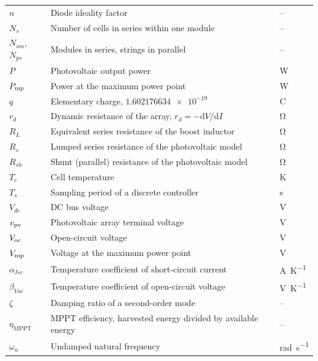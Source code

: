 \begin{longtable}{@{}L{0.16\textwidth}L{0.62\textwidth}L{0.14\textwidth}@{}}
$n$ & Diode ideality factor & -- \\
$N_s$ & Number of cells in series within one module & -- \\
$N_{sm}$, $N_{ps}$ & Modules in series, strings in parallel & -- \\
$P$ & Photovoltaic output power & \si{\watt} \\
$P_{\mathrm{mp}}$ & Power at the maximum power point & \si{\watt} \\
$q$ & Elementary charge, $\num{1.602176634e-19}$ & \si{\coulomb} \\
$r_d$ & Dynamic resistance of the array, $r_d = -\mathrm{d}V/\mathrm{d}I$ & \si{\ohm} \\
$R_L$ & Equivalent series resistance of the boost inductor & \si{\ohm} \\
$R_s$ & Lumped series resistance of the photovoltaic model & \si{\ohm} \\
$R_{sh}$ & Shunt (parallel) resistance of the photovoltaic model & \si{\ohm} \\
$T_c$ & Cell temperature & \si{\kelvin} \\
$T_s$ & Sampling period of a discrete controller & \si{\second} \\
$V_{dc}$ & DC bus voltage & \si{\volt} \\
$v_{\mathrm{pv}}$ & Photovoltaic array terminal voltage & \si{\volt} \\
$V_{\mathrm{oc}}$ & Open-circuit voltage & \si{\volt} \\
$V_{\mathrm{mp}}$ & Voltage at the maximum power point & \si{\volt} \\
$\alpha_{Isc}$ & Temperature coefficient of short-circuit current & \si{\ampere\per\kelvin} \\
$\beta_{Voc}$ & Temperature coefficient of open-circuit voltage & \si{\volt\per\kelvin} \\
$\zeta$ & Damping ratio of a second-order mode & -- \\
$\eta_{\mathrm{MPPT}}$ & MPPT efficiency, harvested energy divided by available energy & -- \\
$\omega_n$ & Undamped natural frequency & \si{\radian\per\second} \\
\bottomrule
\end{longtable}
